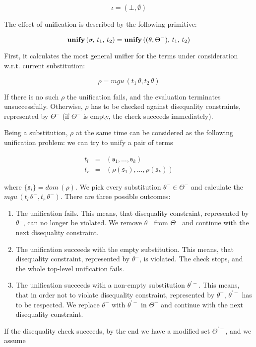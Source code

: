 $$
\iota=(\bot,\emptyset)
$$

The effect of unification is described by the following primitive:

$$
{\bf unify}\,(\sigma,\,t_1,\,t_2)={\bf unify}\,((\theta,\Theta^-),\,t_1,\,t_2)
$$

First, it calculates the most general unifier for the terms under consideration w.r.t. current substitution:

$$
\rho=mgu\,(t_1\,\theta,t_2\,\theta)
$$

If there is no such $\rho$ the unification fails, and the evaluation terminates unsuccessfully. Otherwise,
$\rho$ has to be checked against disequality constraints, represented by $\Theta^-$ (if $\Theta^-$ is empty, the
check succeeds immediately).

Being a substitution, $\rho$ at the same time can be considered as the following unification problem: we can try to unify a pair of terms 

$$
\begin{array}{rcl}
t_l&=&(\mathfrak s_1,\dots,\mathfrak s_k)\\
t_r&=&(\rho(\mathfrak s_1),\dots,\rho(\mathfrak s_k))
\end{array}
$$

\noindent where $\{\mathfrak s_i\}=dom\,(\rho)$. We pick every substitution $\theta^-\in\Theta^-$ and calculate 
the $mgu\,(t_l\,\theta^-,t_r\,\theta^-)$. There are three possible outcomes:

\begin{enumerate}
\item The unification fails. This means, that disequality constraint, represented by $\theta^-$, can no
longer be violated. We remove $\theta^-$ from $\Theta^-$ and continue with the next disequality constraint.
\item The unification succeeds with the empty substitution. This means, that 
disequality constraint, represented by $\theta^-$, is violated. The check stops, and the whole top-level 
unification fails.
\item The unification succeeds with a non-empty substitution $\theta^{\prime-}$. This means, that in order not to 
violate disequality constraint, represented by $\theta^-$, $\theta^{\prime-}$ has to be respected. We replace
$\theta^-$ with $\theta^{\prime-}$ in $\Theta^-$ and continue with the next disequality constraint.
\end{enumerate}

If the disequality check succeeds, by the end we have a modified set $\Theta^{\prime-}$, and we assume

